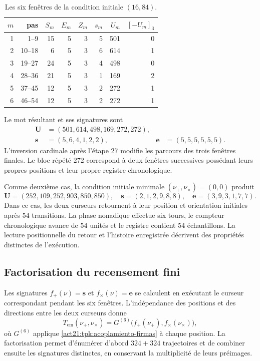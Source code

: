 \begin{table}[htbp]
\caption{Les six fenêtres de la condition initiale \((16,84)\).}
\label{act21:tpk:tabla-seis501}
\begin{tabular}{@{}rrrrrrrr@{}}
\toprule
\(m\)&pas&\(S_m\)&\(E_m\)&\(Z_m\)&\(s_m\)&\(U_m\)&\([-U_m]_3\)\\
\midrule
1&1--9&15&5&3&5&501&0\\
2&10--18&6&5&3&6&614&1\\
3&19--27&24&5&3&4&498&0\\
4&28--36&21&5&3&1&169&2\\
5&37--45&12&5&3&2&272&1\\
6&46--54&12&5&3&2&272&1\\
\bottomrule
\end{tabular}
\end{table}

Le mot résultant et ses signatures sont
\begin{align*}
 \mathbf U&=(501,614,498,169,272,272),\\
 \mathbf s&=(5,6,4,1,2,2),&
 \mathbf e&=(5,5,5,5,5,5).
\end{align*}
L'inversion cardinale après l'étape \(27\) modifie les parcours des
trois fenêtres finales. Le bloc répété \(272\) correspond à deux
fenêtres successives possédant leurs propres positions et leur propre registre chronologique.

Comme deuxième cas, la condition initiale minimale \((\nu_+,\nu_\times)=(0,0)\)
produit
\[
 \mathbf U=(252,109,252,903,850,850),\quad
 \mathbf s=(2,1,2,9,8,8),\quad
 \mathbf e=(3,9,3,1,7,7).
\]
Dans ce cas, les deux curseurs retournent à leur position et orientation initiales
après \(54\) transitions. La phase nonadique effectue six tours, le
compteur chronologique avance de \(54\) unités et le registre contient
\(54\) échantillons. La lecture positionnelle du retour et
l'histoire enregistrée décrivent des propriétés distinctes de l'exécution.

\subsection{Factorisation du recensement fini}
\label{act21:tpk:censo}

Les signatures \(f_+(\nu)=\mathbf s\) et \(f_\times(\nu)=\mathbf e\) se
calculent en exécutant le curseur correspondant pendant les six fenêtres.
L'indépendance des positions et des directions entre les deux curseurs donne
\begin{equation}
 T_{\mathrm{em}}(\nu_+,\nu_\times)
   =G^{(6)}\bigl(f_+(\nu_+),f_\times(\nu_\times)\bigr),
 \label{act21:tpk:factorizacion}
\end{equation}
où \(G^{(6)}\) applique \eqref{act21:tpk:acoplamiento-firmas} à chaque position.
La factorisation permet d'énumérer d'abord \(324+324\) trajectoires et
de combiner ensuite les signatures distinctes, en conservant la multiplicité de
leurs préimages.

